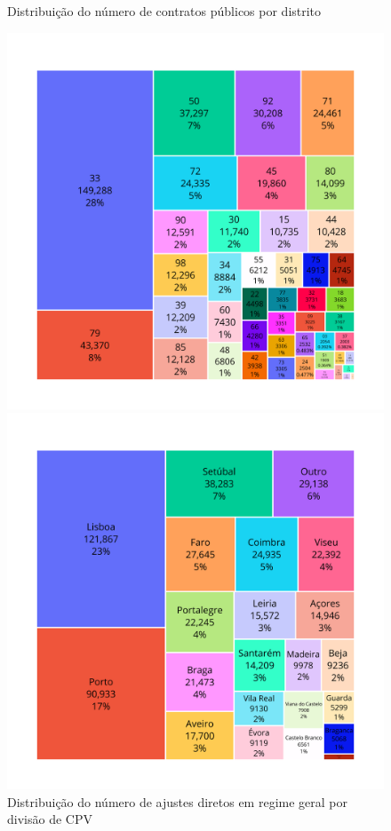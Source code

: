 \begin{figure}[H]
\begin{minipage}[t]{.55\textwidth}
		\caption{Distribuição do número de contratos públicos por distrito}
	\end{minipage}
	
	\medskip
	
	\begin{minipage}[t]{.55\textwidth}
		\centering
		\includegraphics[width=\textwidth]{imagens/treemap_contratos_adir.png}
		\caption{Distribuição do número de ajustes diretos em regime geral por divisão de CPV}
	\end{minipage}
	\begin{minipage}[t]{.55\textwidth}
		\centering
		\includegraphics[width=\textwidth]{imagens/treemap_distritos_adir.png}

\end{minipage}
\end{figure}
